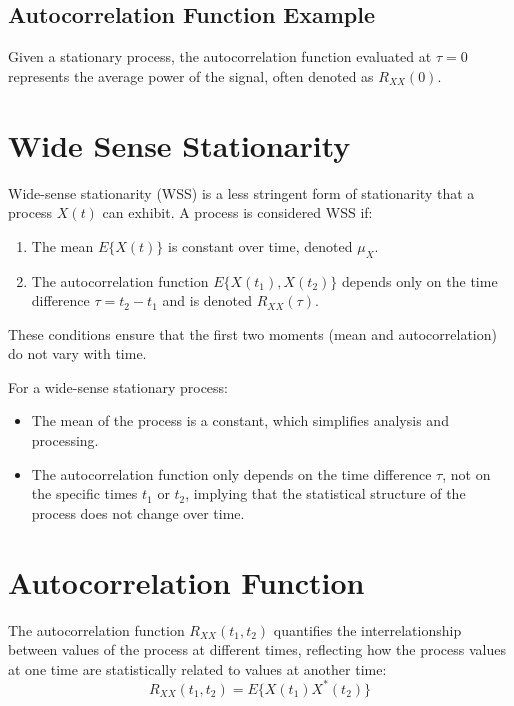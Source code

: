 \subsection*{Autocorrelation Function Example}
Given a stationary process, the autocorrelation function evaluated at \( \tau = 0 \) represents the average power of the signal, often denoted as \( R_{XX}(0) \).


\section*{Wide Sense Stationarity}

Wide-sense stationarity (WSS) is a less stringent form of stationarity that a process \( X(t) \) can exhibit. A process is considered WSS if:
\begin{enumerate}
    \item The mean \( E\{X(t)\} \) is constant over time, denoted \( \mu_X \).
    \item The autocorrelation function \( E\{X(t_1),X(t_2)\} \) depends only on the time difference \( \tau = t_2 - t_1 \) and is denoted \( R_{XX}(\tau) \).
\end{enumerate}
These conditions ensure that the first two moments (mean and autocorrelation) do not vary with time.

For a wide-sense stationary process:
\begin{itemize}
    \item The mean of the process is a constant, which simplifies analysis and processing.
    \item The autocorrelation function only depends on the time difference \( \tau \), not on the specific times \( t_1 \) or \( t_2 \), implying that the statistical structure of the process does not change over time.
\end{itemize}

\section*{Autocorrelation Function}

The autocorrelation function \( R_{XX}(t_1, t_2) \) quantifies the interrelationship between values of the process at different times, reflecting how the process values at one time are statistically related to values at another time:
\[ R_{XX}(t_1, t_2) = E\{X(t_1)X^*(t_2)\} \]


